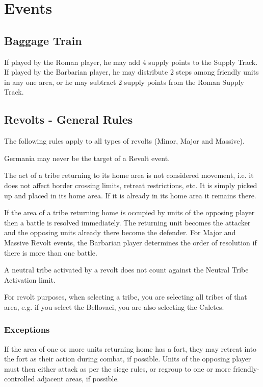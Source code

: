 \clearpage
\section{Events}
\subsection{Baggage Train}
If played by the Roman player, he may add 4 supply points to the
Supply Track. If played by the Barbarian player, he may distribute
2 steps among friendly units in any one area, or he may subtract 2
supply points from the Roman Supply Track.

\subsection{Revolts - General Rules}
The following rules apply to all types of revolts (Minor, Major and Massive).

Germania may never be the target of a Revolt event.

The act of a tribe returning to its home area is not considered movement, i.e. it does not affect border crossing limits, retreat restrictions, etc. It is simply picked up and placed in its home area. If it is already in its home area it remains there.

If the area of a tribe returning home is occupied by units of the opposing player then a battle is resolved immediately. The returning unit becomes the attacker and the opposing units already there become the defender. For Major and Massive Revolt events, the Barbarian player determines the order of resolution if there is more than one battle.

A neutral tribe activated by a revolt does not count against the Neutral Tribe Activation limit.

For revolt purposes, when selecting a tribe, you are selecting all tribes of that area, e.g. if you select the Bellovaci, you are also selecting the Caletes.

\subsubsection{Exceptions}

If the area of one or more units returning home has a fort, they may retreat into the fort as their action during combat, if possible. Units of the opposing player must then either attack as per the siege rules, or regroup to one or more friendly-controlled adjacent areas, if possible.

